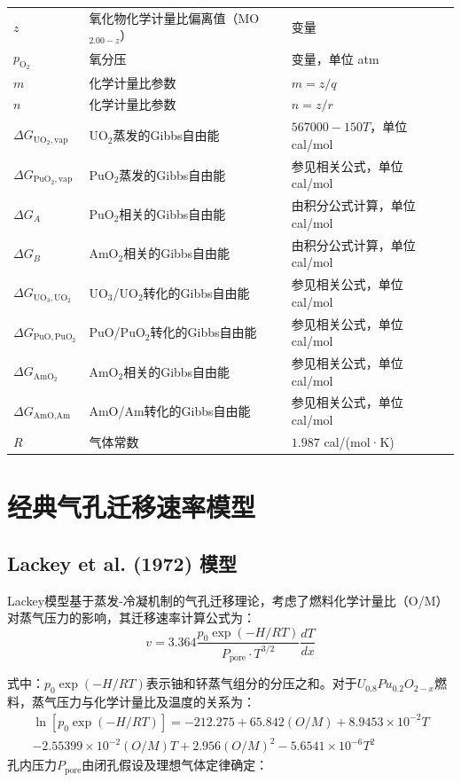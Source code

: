 \begin{xltabular}{\textwidth}{>{\centering\arraybackslash{}\hsize}X 
		>{\RaggedRight\arraybackslash{}\hsize}X 
		>{\centering\arraybackslash{}\hsize}X}
	$z$ & 氧化物化学计量比偏离值（MO$_{2.00 - z}$） & 变量 \\
	$p_{\text{O}_2}$ & 氧分压 & 变量，单位 atm \\
	$m$ & 化学计量比参数 & $m = z/q$ \\
	$n$ & 化学计量比参数 & $n = z/r$ \\
	$\Delta G_{\text{UO}_2,\text{vap}}$ & UO$_2$蒸发的Gibbs自由能 & $567000 - 150T$，单位 cal/mol \\
	$\Delta G_{\text{PuO}_2,\text{vap}}$ & PuO$_2$蒸发的Gibbs自由能 & 参见相关公式，单位 cal/mol \\
	$\Delta G_A$ & PuO$_2$相关的Gibbs自由能 & 由积分公式计算，单位 cal/mol \\
	$\Delta G_B$ & AmO$_2$相关的Gibbs自由能 & 由积分公式计算，单位 cal/mol \\
	$\Delta G_{\text{UO}_3,\text{UO}_2}$ & UO$_3$/UO$_2$转化的Gibbs自由能 & 参见相关公式，单位 cal/mol \\
	$\Delta G_{\text{PuO},\text{PuO}_2}$ & PuO/PuO$_2$转化的Gibbs自由能 & 参见相关公式，单位 cal/mol \\
	$\Delta G_{\text{AmO}_2}$ & AmO$_2$相关的Gibbs自由能 & 参见相关公式，单位 cal/mol \\
	$\Delta G_{\text{AmO},\text{Am}}$ & AmO/Am转化的Gibbs自由能 & 参见相关公式，单位 cal/mol \\
	$R$ & 气体常数 & $1.987$ cal/(mol·K) \\
\end{xltabular}


\section{经典气孔迁移速率模型}

\subsection{Lackey et al. (1972) 模型}

Lackey模型基于蒸发-冷凝机制的气孔迁移理论，考虑了燃料化学计量比（O/M）对蒸气压力的影响，其迁移速率计算公式为：
\begin{equation}
	v = 3.364 \frac{p_0 \exp(-H/RT)}{P_{\text{pore}} \cdot T^{3/2}} \frac{dT}{dx}
	\label{eq:app_b_lackey_migration_velocity}
\end{equation}

\noindent 式中：$p_0 \exp(-H/RT)$表示铀和钚蒸气组分的分压之和。对于$U_{0.8}Pu_{0.2}O_{2-x}$燃料，蒸气压力与化学计量比及温度的关系为：
\begin{equation}
	\begin{gathered}
		\ln[p_0 \exp(-H/RT)] =  -212.275 + 65.842(O/M) + 8.9453 \times 10^{-2}T \\
		- 2.55399 \times 10^{-2}(O/M)T + 2.956(O/M)^2 - 5.6541 \times 10^{-6}T^2
	\end{gathered}
	\label{eq:app_b_lackey_vapor_pressure_fit}
\end{equation}
孔内压力$P_{\text{pore}}$由闭孔假设及理想气体定律确定：

